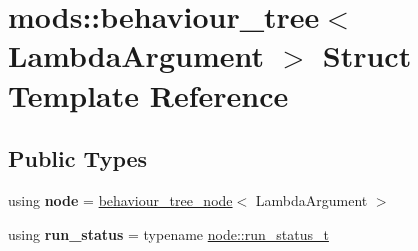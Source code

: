 \hypertarget{structmods_1_1behaviour__tree}{}\section{mods\+:\+:behaviour\+\_\+tree$<$ Lambda\+Argument $>$ Struct Template Reference}
\label{structmods_1_1behaviour__tree}
\subsection*{Public Types}
\begin{DoxyCompactItemize}
\item 
\mbox{\label{structmods_1_1behaviour__tree_a6e3cdbaab617980dbe7e49834ec02791}} 
using {\bfseries node} = \hyperlink{structmods_1_1behaviour__tree__node}{behaviour\+\_\+tree\+\_\+node}$<$ Lambda\+Argument $>$
\item 
\mbox{\label{structmods_1_1behaviour__tree_a7a9fdf57f4de665bf52178a6e2f6a33b}} 
using {\bfseries run\+\_\+status} = typename \hyperlink{structmods_1_1behaviour__tree__node_1_1run__status__t}{node\+::run\+\_\+status\+\_\+t}
\end{DoxyCompactItemize}

